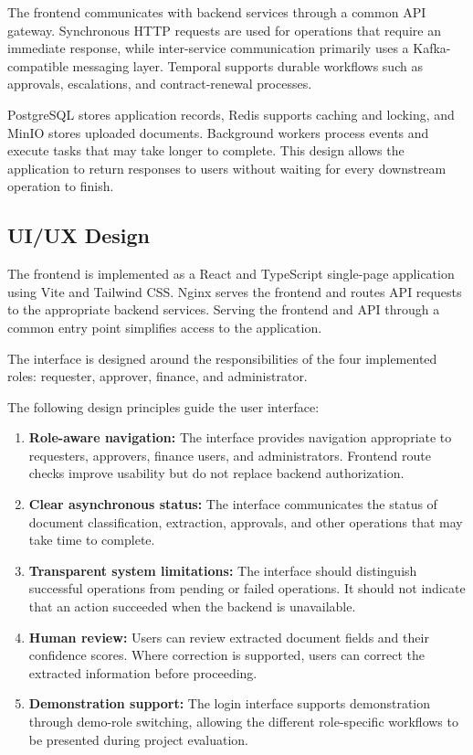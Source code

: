 \documentclass[12pt,a4paper]{report}
\begin{document}
The frontend communicates with backend services through a common API
gateway. Synchronous HTTP requests are used for operations that require
an immediate response, while inter-service communication primarily
uses a Kafka-compatible messaging layer. Temporal supports durable
workflows such as approvals, escalations, and contract-renewal
processes.

PostgreSQL stores application records, Redis supports caching and
locking, and MinIO stores uploaded documents. Background workers
process events and execute tasks that may take longer to complete.
This design allows the application to return responses to users
without waiting for every downstream operation to finish.

\subsection{UI/UX Design}

The frontend is implemented as a React and TypeScript single-page
application using Vite and Tailwind CSS. Nginx serves the frontend
and routes API requests to the appropriate backend services. Serving
the frontend and API through a common entry point simplifies access
to the application.

The interface is designed around the responsibilities of the four
implemented roles: requester, approver, finance, and administrator.

The following design principles guide the user interface:

\begin{enumerate}[label=\arabic*.]
    \item \textbf{Role-aware navigation:}
    The interface provides navigation appropriate to requesters,
    approvers, finance users, and administrators. Frontend route
    checks improve usability but do not replace backend
    authorization.

    \item \textbf{Clear asynchronous status:}
    The interface communicates the status of document classification,
    extraction, approvals, and other operations that may take time
    to complete.

    \item \textbf{Transparent system limitations:}
    The interface should distinguish successful operations from
    pending or failed operations. It should not indicate that an
    action succeeded when the backend is unavailable.

    \item \textbf{Human review:}
    Users can review extracted document fields and their confidence
    scores. Where correction is supported, users can correct the
    extracted information before proceeding.

    \item \textbf{Demonstration support:}
    The login interface supports demonstration through demo-role
    switching, allowing the different role-specific workflows to
    be presented during project evaluation.
\end{enumerate}
\end{document}
